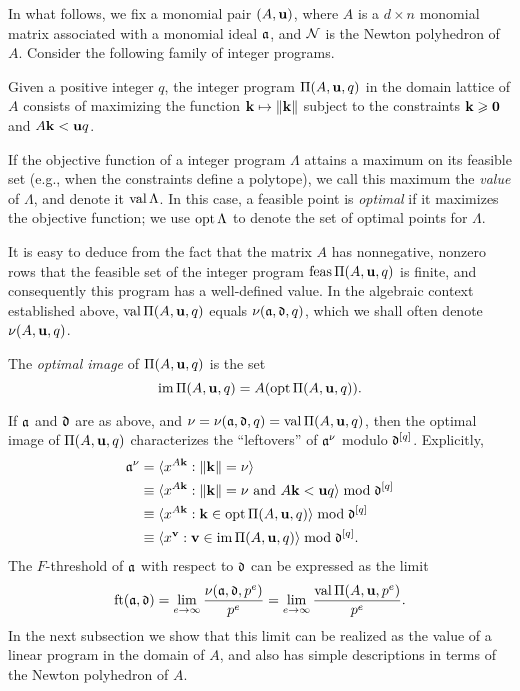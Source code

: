 \documentclass[11pt]{amsart}
\begin{document}
In what follows, we fix a monomial pair $(A,\mathbf{u})$, where $A$ is a $d\times n$ monomial matrix associated with a monomial ideal $\mathfrak{a}$, and $\mathcal{N}$ is the Newton polyhedron of $A$.
Consider the following family of integer programs.

\begin{definition}
   Given a positive integer $q$, the integer program $\Pi(A, \mathbf{u}, q)$ in the domain lattice of $A$ consists of maximizing the function $\mathbf{k} \mapsto \| \mathbf{k} \|$ subject to the constraints $\mathbf{k} \geqslant \mathbf{0}$ and $A \mathbf{k} < \mathbf{u}q$.
\end{definition}

If the objective function of a integer program $\Lambda$ attains a maximum on its feasible set (e.g., when the constraints define a polytope), we call this maximum the
\emph{value} of $\Lambda$, and denote it $\operatorname{val} \Lambda$.  In this case, a feasible point is \emph{optimal} if it maximizes the objective function; we use $\operatorname{opt} \Lambda$ to
denote the set of optimal points for $\Lambda$.

It is easy to deduce from the fact that the matrix $A$ has nonnegative, nonzero rows that the feasible set of the integer program $\operatorname{feas} \Pi(A,\mathbf{u},q)$ is finite, and consequently this program has a well-defined value.
In the algebraic context established above, $\operatorname{val} \Pi(A,\mathbf{u},q)$ equals $\nu(\mathfrak{a},\mathfrak{d},q)$, which we shall often denote $\nu(A,\mathbf{u},q)$.

\begin{definition}
   The \emph{optimal image} of $\Pi(A, \mathbf{u}, q)$ is the set \[ \operatorname{im} \Pi(A, \mathbf{u}, q) = A ( \operatorname{opt} \Pi(A, \mathbf{u}, q) ). \]
\end{definition}

If $\mathfrak{a}$ and $\mathfrak{d}$ are as above, and $\nu = \nu(\mathfrak{a},\mathfrak{d},q) = \operatorname{val} \Pi(A,\mathbf{u},q)$, then the optimal image of $\Pi(A,\mathbf{u},q)$ characterizes the ``leftovers'' of $\mathfrak{a}^\nu$ modulo $\mathfrak{d}^{[q]}$.
Explicitly,
\begin{align*}
  \mathfrak{a}^{\nu} &= \langle x^{A\mathbf{k}}: \| \mathbf{k} \|=\nu \rangle\\
  &\equiv \langle x^{A\mathbf{k}}: \| \mathbf{k} \|=\nu\text{ and } A\mathbf{k} <\mathbf{u}q \rangle \bmod \mathfrak{d}^{[q]}\\
  &\equiv \langle x^{A\mathbf{k}}: \mathbf{k}\in \operatorname{opt}\Pi(A,\mathbf{u},q) \rangle \bmod \mathfrak{d}^{[q]}\\
  &\equiv \langle x^{\mathbf{v}}: \mathbf{v} \in \operatorname{im} \Pi(A,\mathbf{u},q) \rangle \bmod \mathfrak{d}^{[q]}.
\end{align*}
The $F$-threshold of $\mathfrak{a}$ with respect to $\mathfrak{d}$ can be expressed as the limit
\begin{equation}\label{eq: limit}
\operatorname{ft}(\mathfrak{a}, \mathfrak{d}) = \lim_{e\to\infty} \frac{\nu(\mathfrak{a},\mathfrak{d},p^e)}{p^e} = \lim_{e\to\infty} \frac{\operatorname{val} \Pi(A,\mathbf{u},p^e)}{p^e}.
\end{equation}
In the next subsection we show that this limit can be realized as the value of a linear program in the domain of $A$, and also has simple descriptions in terms of the Newton polyhedron of $A$.
\end{document}
